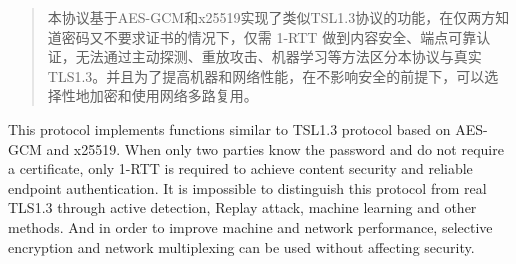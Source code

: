 

\begin{abstract}
	本协议基于AES-GCM和x25519实现了类似TSL1.3协议的功能，在仅两方知道密码又不要求证书的情况下，仅需 1-RTT 做到内容安全、端点可靠认证，无法通过主动探测、重放攻击、机器学习等方法区分本协议与真实TLS1.3。并且为了提高机器和网络性能，在不影响安全的前提下，可以选择性地加密和使用网络多路复用。

\end{abstract}

\begin{abstract*}
	This protocol implements functions similar to TSL1.3 protocol based on AES-GCM and x25519. When only two parties know the password and do not require a certificate, only 1-RTT is required to achieve content security and reliable endpoint authentication. It is impossible to distinguish this protocol from real TLS1.3 through active detection, Replay attack, machine learning and other methods. And in order to improve machine and network performance, selective encryption and network multiplexing can be used without affecting security.

\end{abstract*}
